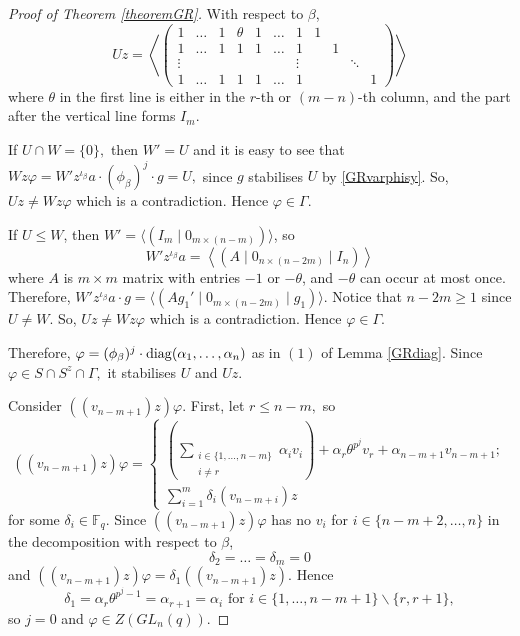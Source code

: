 \begin{proof}[Proof of Theorem {\rm \ref{theoremGR}}]
 With respect to $\beta$,
$$Uz= \left \langle 
\left(\begin{array}{ccccccc|ccccc}
1 & \ldots & 1 & \theta &1 & \ldots & 1     &             1 & & &  \\
1 & \ldots & 1 &  1    &1 & \ldots & 1       &           & 1 & &  \\
\vdots &   &   &       &  &        &\vdots    &          & &\ddots & \\
1 & \ldots & 1 &  1    &1 & \ldots & 1         &         & & & 1 
\end{array}\right)
\right \rangle$$
where $\theta$ in the first line is either in the $r$-th or $(m-n)$-th column, and the part after the vertical line forms $I_m.$

 If $U \cap W=\{0\},$ then $W'=U$ and it is easy to see that $Wz \varphi = W'z^{\iota_{\beta}}a\cdot (\phi_{\beta})^j \cdot g= U,$ since $g$ stabilises $U$ by \eqref{GRvarphisy}. So, $Uz \ne Wz \varphi$ which is a contradiction. Hence $\varphi \in \Gamma.$

If $U \le W$, then $W'= \langle (I_m \mid 0_{ m \times (n-m)}) \rangle$, so 
$$W'z^{\iota_{\beta}}a= \left \langle 
(A \mid 0_{n \times (n-2m)} \mid I_n)
\right \rangle$$
where $A$ is $m \times m$ matrix with entries $-1$ or $- \theta$, and $-\theta$ can occur at most once.
Therefore, $W'z^{\iota_{\beta}}a \cdot g = \langle (A g_1'\mid0_{m \times (n-2m)}\mid g_1) \rangle$. Notice that $n-2m\ge 1$ since $U \ne W.$ So, $Uz \ne Wz \varphi$ which is a contradiction. Hence $\varphi \in \Gamma.$

Therefore, $\varphi = (\phi_{\beta})^j \cdot \mathrm{diag}(\alpha_1, \ldots, \alpha_n)$ as in $(1)$ of Lemma
\ref{GRdiag}. Since $\varphi \in S \cap S^z \cap \Gamma,$ it stabilises $U$ and $Uz.$  

Consider $((v_{n-m+1})z) \varphi.$ First, let $r\le n-m,$ so %
\begin{equation*}((v_{n-m+1})z) \varphi=
\begin{cases}
\left(\sum_{\substack{i \in \{1, \ldots, n-m\}\\ i \ne r}} \alpha_i v_i \right) + \alpha_r \theta^{p^j} v_r + \alpha_{n-m+1} v_{n-m+1};\\
\sum_{i=1}^m \delta_i (v_{n-m+i})z
\end{cases}
\end{equation*}
for some $\delta_i \in \mathbb{F}_q.$ Since $((v_{n-m+1})z) \varphi$ has no $v_i$ for $i \in \{n-m+2, \ldots, n\}$ in the decomposition with respect to $\beta$, 
$$\delta_2 = \ldots = \delta_m =0$$
and $((v_{n-m+1})z) \varphi= \delta_1 ((v_{n-m+1})z).$ Hence 
$$\delta_1 = \alpha_r \theta^{p^j-1}=\alpha_{r+1} = \alpha_i \text{ for } i \in \{1, \ldots, n-m+1\} \backslash \{r,r+1\},$$
so $j=0$ and $\varphi \in Z(GL_n(q)).$


\end{proof}
